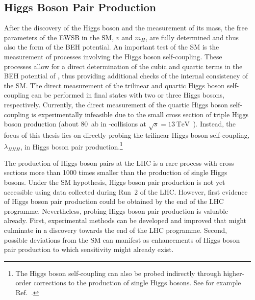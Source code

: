 \subsection{Higgs Boson Pair Production}%
\label{fig:theory_higgs_pair_prod}


After the discovery of the Higgs boson and the measurement of its mass, the free
parameters of the EWSB in the SM, $v$ and $m_H$, are fully determined and thus
also the form of the BEH potential. An important test of the SM is the
measurement of processes involving the Higgs boson self-coupling. These
processes allow for a direct determination of the cubic and quartic terms in the
BEH potential of , thus providing additional checks of
the internal consistency of the SM. The direct measurement of the trilinear and
quartic Higgs boson self-coupling can be performed in final states with two or
three Higgs bosons, respectively. Currently, the direct measurement of the
quartic Higgs boson self-coupling is experimentally infeasible due to the small
cross section of triple Higgs boson production (about \SI{80}{\atto\barn} in
\pp-collisions at $\sqrt{s} = \SI{13}{\TeV}$~\cite{Maltoni:2014eza}). Instead,
the focus of this thesis lies on directly probing the trilinear Higgs boson
self-coupling, $\lambda_{HHH}$, in Higgs boson pair production.\footnote{The
  Higgs boson self-coupling can also be probed indirectly through higher-order
  corrections to the production of single Higgs bosons. See for example
  Ref.~\cite{Degrassi:2016wml,ATLAS-CONF-2022-050}.}



The production of Higgs boson pairs at the LHC is a rare process with cross
sections more than 1000 times smaller than the production of single Higgs
bosons. Under the SM hypothesis, Higgs boson pair production is not yet
accessible using data collected during Run~2 of the LHC. However, first evidence
of Higgs boson pair production could be obtained by the end of the LHC
programme. Nevertheless, probing Higgs boson pair production is valuable
already. First, experimental methods can be developed and improved that might
culminate in a discovery towards the end of the LHC programme. Second, possible
deviations from the SM can manifest as enhancements of Higgs boson pair
production to which sensitivity might already exist.


